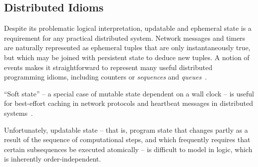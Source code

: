 
\subsection{Distributed Idioms}

Despite its problematic logical interpretation, updatable and ephemeral state is a requirement
for any practical distributed system.  Network messages and timers are
naturally represented as ephemeral tuples that are only instantaneously true, 
but which may be joined with persistent state to deduce new
tuples.  A notion of events makes it straightforward to represent many useful
distributed programming idioms, including counters or \emph{sequences} and
\emph{queues}~\cite{netdb}.

``Soft state'' -- a special case of mutable state dependent on a wall clock -- 
is  useful for best-effort
caching in network protocols and heartbeat messages in distributed
systems~\cite{boom-techr}.  

Unfortunately, updatable state -- that is, program state that changes partly as a result of the 
sequence of computational steps, and which frequently requires that certain subsequences be executed atomically -- is difficult to model in logic, which is inherently order-independent.  


